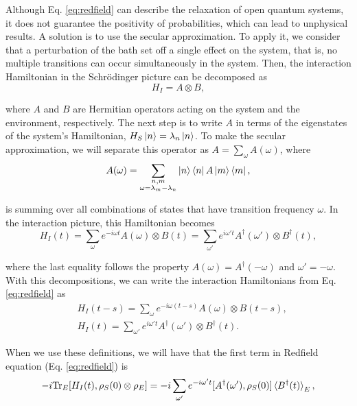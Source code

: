 Although Eq. \eqref{eq:redfield} can describe the relaxation of open quantum systems, it does not guarantee the positivity of probabilities, which can lead to unphysical results. A solution is to use the secular approximation. To apply it, we consider that a perturbation of the bath set off a single effect on the system, that is, no multiple transitions can occur simultaneously in the system. Then, the interaction Hamiltonian in the Schrödinger picture can be decomposed as
\begin{equation}
    {H}_I = {A} \otimes {B},
    \label{eq:HI-AkBk}
\end{equation}

\noindent where $A$ and $B$ are Hermitian operators acting on the system and the environment, respectively. The next step is to write ${A}$ in terms of the eigenstates of the system's Hamiltonian, ${H}_S \ket{n} = \lambda_n \ket{n}$. To make the secular approximation, we will separate this operator as ${A} = \sum_\omega {A} (\omega)$, where
\begin{equation}
    {A} (\omega) = \sum_{\substack{n,m \\ \omega = \lambda_m - \lambda_n}} \ket{n}\bra{n} {A} \ket{m}\bra{m},
    \label{eq:Ak-w}
\end{equation}

\noindent is summing over all combinations of states that have transition frequency $\omega$. In the interaction picture, this Hamiltonian becomes
\begin{equation}
    {H}_I (t) = \sum_{\omega} e^{-i\omega t} {A} (\omega) \otimes {B} (t) = \sum_{\omega'} e^{i\omega' t} {A}^\dagger (\omega') \otimes {B}^\dagger (t),
\end{equation}

\noindent where the last equality follows the property $A (\omega) = A^\dagger (-\omega)$ and $\omega' = -\omega$. With this decompositions, we can write the interaction Hamiltonians from Eq. \eqref{eq:redfield} as
\begin{align}
    &{H}_I (t-s) = \sum_{\omega} e^{-i\omega (t-s)} {A} (\omega) \otimes {B} (t-s),\\
    &{H}_I (t) = \sum_{\omega'} e^{i\omega' t} {A}^\dagger (\omega') \otimes {B}^\dagger (t).
\end{align}

\noindent When we use these definitions, we will have that the first term in Redfield equation (Eq. \eqref{eq:redfield}) is
\begin{equation}
    -i \text{Tr}_E[{H}_I(t), {\rho}_S (0) \otimes {\rho}_E] = -i \sum_{\omega'} e^{-i \omega' t} [{A}^\dagger (\omega'), {\rho}_S (0)] \braket{{B}^\dagger (t)}_E,
\end{equation}

